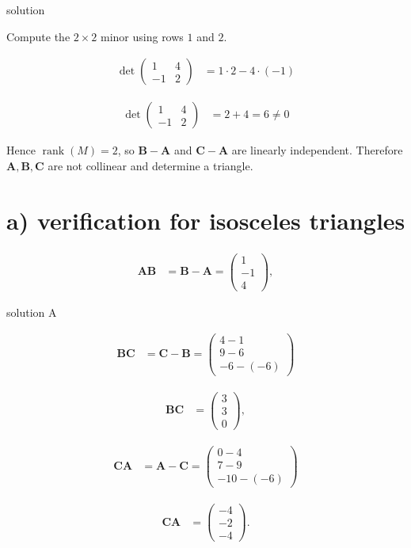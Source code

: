 \documentclass{beamer}
\numberwithin{equation}{section}
\theoremstyle{remark}
\newcommand{\myvec}[1]{\ensuremath{\begin{pmatrix}#1\end{pmatrix}}}
\let\vec\mathbf
\begin{document}
\begin{frame}{solution}

Compute the $2\times2$ minor using rows $1$ and $2$.

\begin{align}
\det\begin{pmatrix}1 & 4\\[4pt] -1 & 2\end{pmatrix}
&= 1\cdot 2 - 4\cdot(-1)
\end{align}

\begin{align}
\det\begin{pmatrix}1 & 4\\[4pt] -1 & 2\end{pmatrix}
&= 2 + 4 = 6 \neq 0
\end{align}

Hence $\operatorname{rank}(M)=2$, so $\vec{B}-\vec{A}$ and $\vec{C}-\vec{A}$ are linearly independent.  
Therefore $\vec{A},\vec{B},\vec{C}$ are not collinear and determine a triangle.

\section*{a) verification for isosceles triangles}
\begin{align}
\vec{AB} &= \vec{B}-\vec{A} = \myvec{1\\-1\\4},
\end{align}

\end{frame}
\begin{frame}{solution A }

\begin{align}
\vec{BC} &= \vec{C}-\vec{B} = \myvec{4-1\\[4pt]9-6\\[4pt]-6-(-6)}
\end{align}

\begin{align}
\vec{BC} &= \myvec{3\\3\\0},
\end{align}

\begin{align}
\vec{CA} &= \vec{A}-\vec{C} = \myvec{0-4\\[4pt]7-9\\[4pt]-10-(-6)}
\end{align}

\begin{align}
\vec{CA} &= \myvec{-4\\-2\\-4}.
\end{align}

\end{frame}
\end{document}
